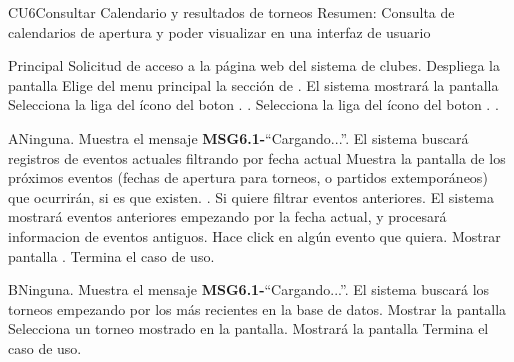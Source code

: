 \begin{UseCase}{CU6}{Consultar Calendario y resultados de torneos}{
		Resumen: Consulta de calendarios de apertura y poder visualizar en una interfaz de usuario }
	\end{UseCase}
	\newpage
	\begin{UCtrayectoria}{Principal}
	\UCpaso[\UCactor] Solicitud de acceso a la página web del sistema de clubes.
	\UCpaso Despliega la pantalla 
	\UCpaso[\UCactor] Elige del menu principal la sección de .
	\UCpaso El sistema mostrará la pantalla  
	\UCpaso[\UCactor] Selecciona la liga del ícono del boton . .
	\UCpaso[\UCactor] Selecciona la liga del ícono del boton . .
\end{UCtrayectoria}

\begin{UCtrayectoriaA}{A}{Ninguna.}
	\UCpaso Muestra el mensaje {\bf MSG6.1-}``Cargando...''.
	\UCpaso El sistema buscará registros de eventos actuales filtrando por fecha actual
	\UCpaso Muestra la pantalla de los próximos eventos (fechas de apertura para torneos, o partidos extemporáneos) que ocurrirán, si es que existen. .
	\UCpaso[\UCactor]Si quiere filtrar eventos anteriores.
	\UCpaso El sistema mostrará eventos anteriores empezando por la fecha actual, y procesará informacion de eventos antiguos.
	\UCpaso[\UCactor] Hace click en algún evento que quiera. 
	\UCpaso Mostrar pantalla .
	\UCpaso[] Termina el caso de uso.
	\end{UCtrayectoriaA}

	\begin{UCtrayectoriaA}{B}{Ninguna.}
		\UCpaso Muestra el mensaje {\bf MSG6.1-}``Cargando...''.
		\UCpaso El sistema buscará los torneos empezando por los más recientes en la base de datos.
		\UCpaso Mostrar la pantalla 
		\UCpaso[\UCactor] Selecciona un torneo mostrado en la pantalla.
		\UCpaso Mostrará la pantalla 
		\UCpaso[] Termina el caso de uso.
	\end{UCtrayectoriaA}
